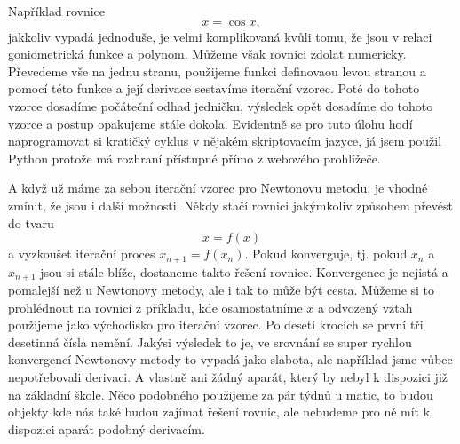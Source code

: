 \documentclass[12pt]{article}
\begin{document}
Například rovnice $$x=\cos x,$$ jakkoliv vypadá jednoduše, je velmi komplikovaná kvůli tomu, že jsou v relaci goniometrická funkce a polynom. Můžeme však rovnici zdolat numericky. Převedeme vše na jednu stranu, použijeme funkci definovaou levou stranou a pomocí této funkce a její derivace sestavíme iterační vzorec. Poté do tohoto vzorce dosadíme počáteční odhad jedničku, výsledek opět dosadíme do tohoto vzorce a postup opakujeme stále dokola. Evidentně se pro tuto úlohu hodí naprogramovat si kratičký cyklus v nějakém skriptovacím jazyce, já jsem použil Python protože má rozhraní přístupné přímo z webového prohlížeče.

A když už máme za sebou iterační vzorec pro Newtonovu metodu, je vhodné zmínit, že jsou i další možnosti. Někdy stačí rovnici jakýmkoliv způsobem převést do tvaru $$x=f(x)$$ a vyzkoušet iterační proces $x_{n+1}=f(x_n)$. Pokud konverguje, tj. pokud $x_n$ a $x_{n+1}$ jsou si stále blíže, dostaneme takto řešení rovnice. Konvergence je nejistá a pomalejší než u Newtonovy metody, ale i tak to může být cesta. Můžeme si to prohlédnout na rovnici z příkladu, kde osamostatníme $x$ a odvozený vztah použijeme jako východisko pro iterační vzorec. Po deseti krocích se první tři desetinná čísla nemění. Jakýsi výsledek to je, ve srovnání se super rychlou konvergencí Newtonovy metody to vypadá jako slabota, ale například jsme vůbec nepotřebovali derivaci. A vlastně ani žádný aparát, který by nebyl k dispozici již na základní škole. Něco podobného použijeme za pár týdnů u matic, to budou objekty kde nás také budou zajímat řešení rovnic, ale nebudeme pro ně mít k dispozici aparát podobný derivacím.
\end{document}
